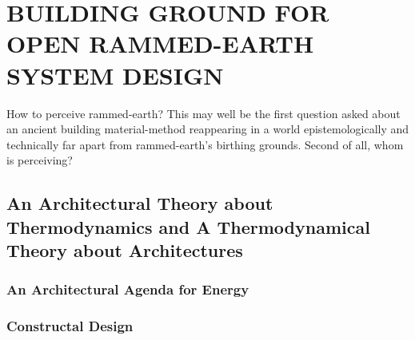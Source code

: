 \section{BUILDING GROUND FOR OPEN RAMMED-EARTH SYSTEM DESIGN}

How to perceive rammed-earth? This may well be the first question asked about an ancient building material-method reappearing in a world epistemologically and technically far apart from rammed-earth's birthing grounds. Second of all, whom is perceiving?

\subsection{An Architectural Theory about Thermodynamics and A Thermodynamical Theory about Architectures}

\subsubsection{An Architectural Agenda for Energy}

\subsubsection{Constructal Design}
